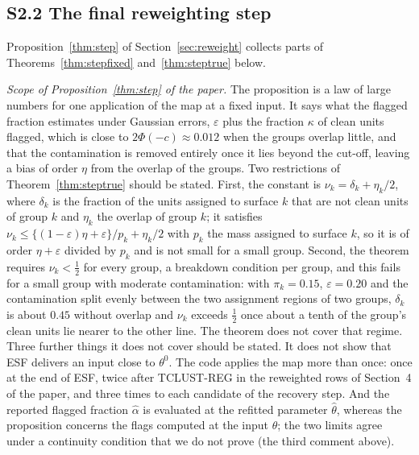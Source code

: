 \subsection*{S2.2 The final reweighting step}
\label{app:reweight}

Proposition~\ref{thm:step} of Section~\ref{sec:reweight} collects parts of
Theorems~\ref{thm:stepfixed} and~\ref{thm:steptrue} below.



\emph{Scope of Proposition~\ref{thm:step} of the paper.} The proposition is a law of large numbers for one application of the map at a fixed input. It
says what the flagged fraction estimates under Gaussian errors, $\varepsilon$ plus the fraction
$\kappa$ of clean units flagged, which is close to $2\Phi(-c)\approx0.012$ when the groups
overlap little, and that the contamination is removed entirely once it lies beyond the
cut-off, leaving a bias of order $\eta$ from the overlap of the groups. Two restrictions of
Theorem~\ref{thm:steptrue} should be stated. First, the constant is
$\nu_k=\delta_k+\eta_k/2$, where $\delta_k$ is the fraction of the units assigned to surface
$k$ that are not clean units of group $k$ and $\eta_k$ the overlap of group $k$; it satisfies
$\nu_k\le\{(1-\varepsilon)\eta+\varepsilon\}/p_k+\eta_k/2$ with $p_k$ the mass assigned to
surface $k$, so it is of order $\eta+\varepsilon$ divided by $p_k$ and is not small for a
small group. Second, the theorem requires $\nu_k<\tfrac12$ for every group, a breakdown
condition per group, and this fails for a small group with moderate contamination: with
$\pi_k=0.15$, $\varepsilon=0.20$ and the contamination split evenly between the two assignment
regions of two groups, $\delta_k$ is about $0.45$ without overlap and $\nu_k$ exceeds
$\tfrac12$ once about a tenth of the group's clean units lie nearer to the other line. The
theorem does not cover that regime. Three further things it does not cover should be stated. It does not show that ESF delivers
an input close to $\theta^{0}$. The code applies the map more than once: once at the end of
ESF, twice after TCLUST-REG in the reweighted rows of Section~4 of the paper, and three
times to each candidate of the recovery step. And the reported flagged fraction $\hat\alpha$
is evaluated at the refitted parameter $\hat\theta$, whereas the proposition concerns the
flags computed at the input $\theta$; the two limits agree under a continuity condition that
we do not prove (the third comment above).




